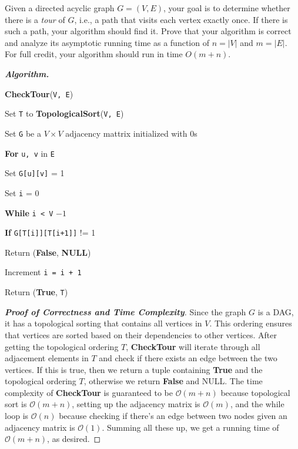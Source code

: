 \documentclass[11pt]{article}
\begin{document}
\begin{enumerate}[leftmargin=*,start=0]
Given a directed acyclic graph $G=(V,E)$, your goal is to determine whether there is a \emph{tour} of $G$, i.e., a path that visits each vertex exactly once. If there is such a path, your algorithm should find it. Prove that your algorithm is correct and analyze its asymptotic running time as a function of $n=|V|$ and $m=|E|$. For full credit, your algorithm should run in time $O(m+n)$.

\hfill

\textbf{\textit{Algorithm.}}

\textbf{CheckTour}(\verb|V, E|)

\hspace{5mm} Set \verb|T| to \textbf{TopologicalSort}(\verb|V, E|)

\hspace{5mm} Set \verb|G| be a $V \times V$ adjacency mattrix initialized with $0$s

\hspace{5mm} \textbf{For} \verb|u, v| in \verb|E|

\hspace{10mm} Set \verb|G[u][v]| = 1

\hspace{5mm} Set \verb|i| = 0

\hspace{5mm} \textbf{While} \verb|i < V| $-1$

\hspace{10mm} \textbf{If} \verb|G[T[i]][T[i+1]]| != 1

\hspace{15mm} Return (\textbf{False}, \textbf{NULL})

\hspace{10mm} Increment \verb|i = i + 1|

\hspace{5mm} Return (\textbf{True}, \verb|T|)

\begin{proof}[\textbf{Proof of Correctness and Time Complexity}]
  Since the graph $G$ is a DAG, it has a topological sorting that contains all vertices in $V$. 
  This ordering ensures that vertices are sorted based on their dependencies to other vertices. After 
  getting the topological ordering $T$, \textbf{CheckTour} will iterate through all adjacement elements in $T$ and 
  check if there exists an edge between the two vertices. If this is true, then we return a tuple 
  containing \textbf{True} and the topological ordering $T$, otherwise we return \textbf{False} and NULL. 
  The time complexity of \textbf{CheckTour} is guaranteed to be $\mathcal{O}(m + n)$ because topological sort is 
  $\mathcal{O}(m + n)$, setting up the adjacency matrix is $\mathcal{O}(m)$, and the while loop is 
  $\mathcal{O}(n)$ because checking if there's an edge between two nodes given an adjacency matrix is $\mathcal{O}(1)$.
  Summing all these up, we get a running time of $\mathcal{O}(m + n)$, as desired.
\end{proof}



\end{enumerate}
\end{document}
